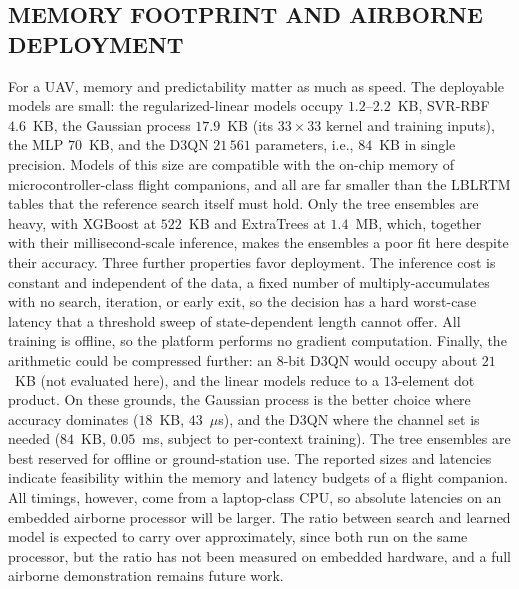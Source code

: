 \documentclass{ieee-ojvt}
\begin{document}
\subsection{MEMORY FOOTPRINT AND AIRBORNE DEPLOYMENT}
\label{sec:deploy}
For a UAV, memory and predictability matter as much as speed. The deployable models are
small: the regularized-linear models occupy $1.2$--$2.2$~KB, SVR-RBF $4.6$~KB, the
Gaussian process $17.9$~KB (its $33\times33$ kernel and training inputs), the MLP
$70$~KB, and the D3QN $21\,561$ parameters, i.e., $84$~KB in single precision. Models of
this size are compatible with the on-chip memory of microcontroller-class flight
companions, and all are far smaller than the LBLRTM tables that the reference search
itself must hold. Only the tree ensembles are heavy, with XGBoost at $522$~KB and
ExtraTrees at $1.4$~MB, which, together with their millisecond-scale inference, makes the
ensembles a poor fit here despite their accuracy. Three further properties favor
deployment. The inference cost is constant and independent of the data, a fixed number of
multiply-accumulates with no search, iteration, or early exit, so the decision has a hard
worst-case latency that a threshold sweep of state-dependent length cannot offer. All
training is offline, so the platform performs no gradient computation. Finally, the
arithmetic could be compressed further: an $8$-bit D3QN would occupy about $21$~KB (not
evaluated here), and the linear models reduce to a $13$-element dot product. On these
grounds, the Gaussian process is the better choice where accuracy dominates ($18$~KB,
$43$~$\mu$s), and the D3QN where the channel set is needed ($84$~KB, $0.05$~ms, subject
to per-context training). The tree ensembles are best reserved for offline or
ground-station use. The reported sizes and latencies indicate feasibility within the
memory and latency budgets of a flight companion. All timings, however, come from a
laptop-class CPU, so absolute latencies on an embedded airborne processor will be larger.
The ratio between search and learned model is expected to carry over approximately,
since both run on the same processor, but the ratio has not been measured on embedded
hardware, and a full airborne demonstration remains future work.
\end{document}
